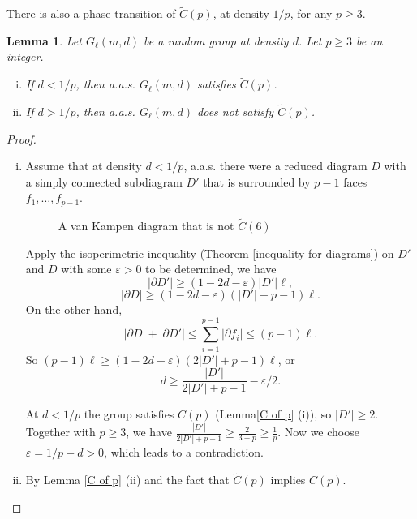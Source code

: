 \documentclass[a4paper]{article}
\def\tilde{\widetilde}
\newtheorem{lem}[thm]{Lemma}
\theoremstyle{remark}
\begin{document}
There is also a phase transition of $\tilde C(p)$, at density $1/p$, for any $p\geq 3$.

\begin{lem}\label{C tilde of p}
    Let $G_\ell(m,d)$ be a random group at density $d$. Let $p\geq 3$ be an integer.
    \begin{enumerate}[(i)]
        \item If $d<1/p$, then a.a.s. $G_\ell(m,d)$ satisfies $\tilde C(p)$.
        \item If $d>1/p$, then a.a.s. $G_\ell(m,d)$ does not satisfy $\tilde C(p)$.
    \end{enumerate}
\end{lem}
\begin{proof}\quad
\begin{enumerate}[(i)]
    \item Assume that at density $d<1/p$, a.a.s. there were a reduced diagram $D$ with a simply connected subdiagram $D'$ that is surrounded by $p-1$ faces $f_1,\dots,f_{p-1}$.
    
    \begin{figure}[h]
    \begin{center}
    \end{center}
        \caption{A van Kampen diagram that is not $\tilde C(6)$}
        \label{fig small cancellation tilde p}
    \end{figure}
    
    Apply the isoperimetric inequality (Theorem \ref{inequality for diagrams}) on $D'$ and $D$ with some $\varepsilon>0$ to be determined, we have
    \[|\partial D'| \geq (1-2d-\varepsilon)|D'|\ell,\]
    \[|\partial D| \geq (1-2d-\varepsilon)(|D'|+p-1)\ell.\]
    On the other hand, \[|\partial D| + |\partial D'| \leq \sum_{i=1}^{p-1}|\partial f_i|\leq (p-1)\ell.\]
    So $(p-1)\ell\geq (1-2d-\varepsilon)(2|D'|+p-1)\ell$, or
    \[d\geq \frac{|D'|}{2|D'|+p-1}-\varepsilon/2.\]

    At $d<1/p$ the group satisfies $C(p)$ (Lemma\ref{C of p} (i)), so $|D'|\geq 2$. Together with $p\geq 3$, we have $\frac{|D'|}{2|D'|+p-1}\geq \frac{2}{3+p} \geq \frac{1}{p}$. Now we choose $\varepsilon = 1/p-d>0$, which leads to a contradiction.

    \item By Lemma \ref{C of p} (ii) and  the fact that $\tilde C(p)$ implies $C(p)$.
\end{enumerate}
\end{proof}
\end{document}
